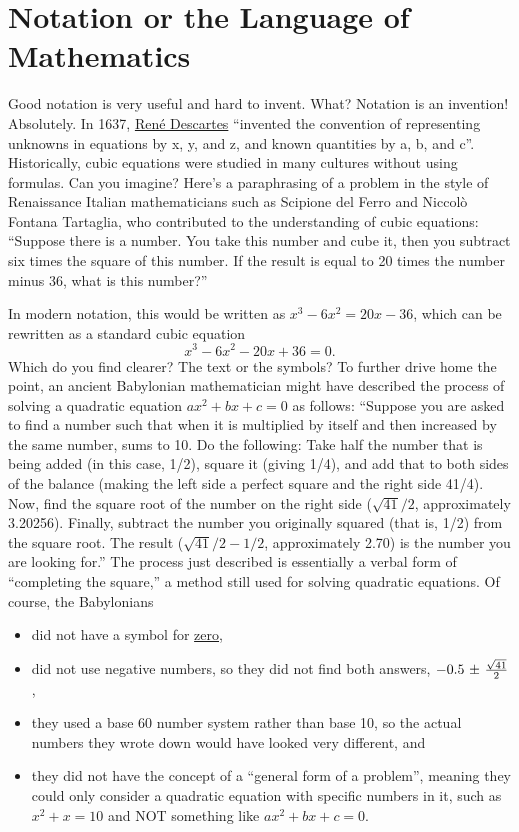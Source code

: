 \section{Notation or the Language of Mathematics}
\label{sec:GoodNotationDescartes}

Good notation is very useful and hard to invent. What? Notation is an invention! Absolutely. In 1637, \href{https://en.wikipedia.org/wiki/Variable_(mathematics)}{René Descartes} ``invented the convention of representing unknowns in equations by x, y, and z, and known quantities by a, b, and c''. Historically, cubic equations were studied in many cultures without using formulas. Can you imagine? Here's a paraphrasing of a problem in the style of Renaissance Italian mathematicians such as Scipione del Ferro and Niccolò Fontana Tartaglia, who contributed to the understanding of cubic equations: ``Suppose there is a number. You take this number and cube it, then you subtract six times the square of this number. If the result is equal to 20 times the number minus 36, what is this number?''

In modern notation, this would be written as $x^3 - 6x^2 = 20x - 36$, which can be rewritten as a standard cubic equation
\begin{equation}
    \label{eqn:CubiCEqn}
    x^3 - 6x^2 - 20x + 36 = 0.
\end{equation}
 Which do you find clearer? The text or the symbols? To further drive home the point, an ancient Babylonian mathematician might have described the process of solving a quadratic equation $ax^2 + bx + c = 0$ as follows: ``Suppose you are asked to find a number such that when it is multiplied by itself and then increased by the same number, sums to 10. Do the following: Take half the number that is being added (in this case, 1/2), square it (giving 1/4), and add that to both sides of the balance (making the left side a perfect square and the right side 41/4). Now, find the square root of the number on the right side ($\sqrt{41}/2$, approximately 3.20256). Finally, subtract the number you originally squared (that is, 1/2) from the square root. The result ($\sqrt{41}/2 - 1/2$, approximately 2.70) is the number you are looking for.'' The process just described is essentially a verbal form of ``completing the square,'' a method still used for solving quadratic equations. Of course, the Babylonians 
 \begin{itemize}
     \item did not have a symbol for \href{https://en.wikipedia.org/wiki/0}{zero}, 
     \item did not use negative numbers, so they did not find both answers, $-0.5~{\mathlarger{\pm}} ~\frac{\sqrt{41}}{2}$
,
     \item they used a base 60 number system rather than base 10, so the actual numbers they wrote down would have looked very different, and
     \item they did not have the concept of a ``general form of a problem'', meaning they could only consider a quadratic equation with specific numbers in it, such as $x^2 + x = 10$ and NOT something like $ax^2 + bx + c = 0$. 
 \end{itemize}

